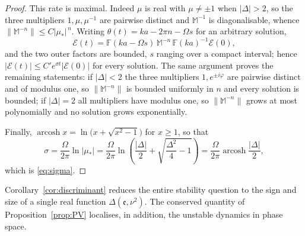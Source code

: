 \documentclass[reqno]{amsart}
\newcommand{\F}{\mathbb{F}}
\newcommand{\ee}{\mathfrak{e}}
\newcommand{\arcosh}{\operatorname{arcosh}} %
\begin{document}
\begin{proof}
This rate is maximal. Indeed $\mu$ is real with $\mu\neq\pm1$ when $|\Delta|>2$, so the three multipliers $1,\mu,\mu^{-1}$ are pairwise distinct and $\mathbb M^{-1}$ is diagonalisable, whence $\|\mathbb M^{-n}\|\le C|\mu_*|^{\,n}$. Writing $\theta(t)=ka-2\pi n-\Omega s$ for an arbitrary solution,
\[
\boldsymbol{\mathcal E}(t)=\F(ka-\Omega s)\,\mathbb M^{-n}\,\F(ka)^{-1}\boldsymbol{\mathcal E}(0),
\]
and the two outer factors are bounded, $s$ ranging over a compact interval; hence $|\boldsymbol{\mathcal E}(t)|\le C'e^{\sigma t}|\boldsymbol{\mathcal E}(0)|$ for every solution. The same argument proves the remaining statements: if $|\Delta|<2$ the three multipliers $1,e^{\pm i\varphi}$ are pairwise distinct and of modulus one, so $\|\mathbb M^{-n}\|$ is bounded uniformly in $n$ and every solution is bounded; if $|\Delta|=2$ all multipliers have modulus one, so $\|\mathbb M^{-n}\|$ grows at most polynomially and no solution grows exponentially.

Finally, $\arcosh x=\ln\bigl(x+\sqrt{x^{2}-1}\bigr)$ for $x\ge1$, so that
\[
\sigma=\frac{\Omega}{2\pi}\ln|\mu_*|
=\frac{\Omega}{2\pi}\ln\left(\frac{|\Delta|}{2}+\sqrt{\frac{\Delta^{2}}{4}-1}\right)
=\frac{\Omega}{2\pi}\arcosh\frac{|\Delta|}{2},
\]
which is \eqref{eq:sigma}.
\end{proof}
\noindent
Corollary~\ref{cor:discriminant} reduces the entire stability question to the sign and size of a single real function $\Delta(\ee,\nu^2)$. The conserved quantity of Proposition~\ref{prop:PV} localises, in addition, the unstable dynamics in phase space.
\end{document}
